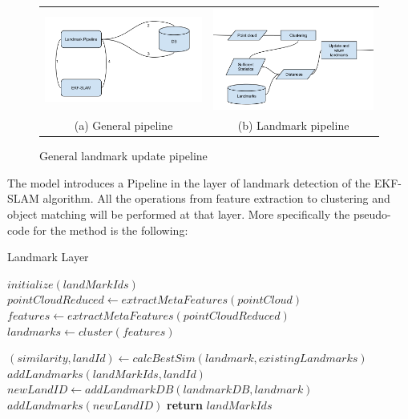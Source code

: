 \documentclass[twoside,hidelinks]{article}
\begin{document}
\begin{figure}
\begin{tabular}{cc}
  \includegraphics[width=65mm]{workflowGen} &    \includegraphics[width=65mm]{workflowSpec} \\
(a) General pipeline & (b) Landmark pipeline \\[6pt]
\end{tabular}
\caption{General landmark update pipeline}
\label{pipeline}
\end{figure}

The model introduces a Pipeline in the layer of landmark detection of the EKF-SLAM algorithm. All the operations from feature extraction to clustering and object matching will be performed at that layer. More specifically the pseudo-code for the method is the following:

\begin{algorithm}
  \caption{Landmark Layer}\label{euclid}
  \begin{algorithmic}[1]
      \State $initialize(landMarkIds)$ 
      \State $pointCloudReduced \gets extractMetaFeatures(pointCloud)$ 
      \State $features \gets extractMetaFeatures(pointCloudReduced)$
      \State $landmarks \gets cluster(features)$  

	      \State $ (similarity, landId) \gets calcBestSim(landmark, existingLandmarks) $
			   \State $ addLandmarks(landMarkIds, landId)$
			\Else 
			   \State $ newLandID \gets addLandmarkDB(landmarkDB, landmark)$ 
			   \State $addLandmarks(newLandID)$ 	   
			\EndIf
      \EndFor
      \State \textbf{return} $ landMarkIds$
    \EndProcedure
  \end{algorithmic}
\end{algorithm}
\end{document}
